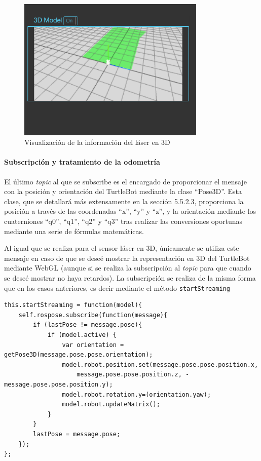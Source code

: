 \begin{figure}[H]
  \begin{center}
    \includegraphics[width=0.8\textwidth]{figures/laser3dturtle.png}
		\caption{Visualización de la información del láser en 3D}
		\label{fig.laser3dturtle}
		\end{center}
\end{figure}

\paragraph{Subscripción y tratamiento de la odometría}

El último \textit{topic} al que se subscribe es el encargado de proporcionar el mensaje con la posición y orientación del TurtleBot mediante la clase ``Pose3D''. Esta clase, que se detallará más extensamente en la sección 5.5.2.3, proporciona la posición a través de las coordenadas ``x'', ``y'' y ``z'', y la orientación mediante los cuaterniones ``q0'', ``q1'', ``q2'' y ``q3'' tras realizar las conversiones oportunas mediante una serie de fórmulas matemáticas.

Al igual que se realiza para el sensor láser en 3D, únicamente se utiliza este mensaje en caso de que se deseé mostrar la representación en 3D del TurtleBot mediante WebGL (aunque si se realiza la subscripción al \textit{topic} para que cuando se deseé mostrar no haya retardos). La subscripción se realiza de la misma forma que en los casos anteriores, es decir mediante el método \texttt{startStreaming}

\begin{lstlisting}[caption= Subscripción y tratamiento del mensaje para obtener la posición, label=cod.pose3d]
this.startStreaming = function(model){
	self.rospose.subscribe(function(message){
		if (lastPose != message.pose){
			if (model.active) {
				var orientation = getPose3D(message.pose.pose.orientation);
				model.robot.position.set(message.pose.pose.position.x, 
					message.pose.pose.position.z, -message.pose.pose.position.y);
				model.robot.rotation.y=(orientation.yaw);
				model.robot.updateMatrix();
			}
		}
		lastPose = message.pose;
	});
};
\end{lstlisting}

